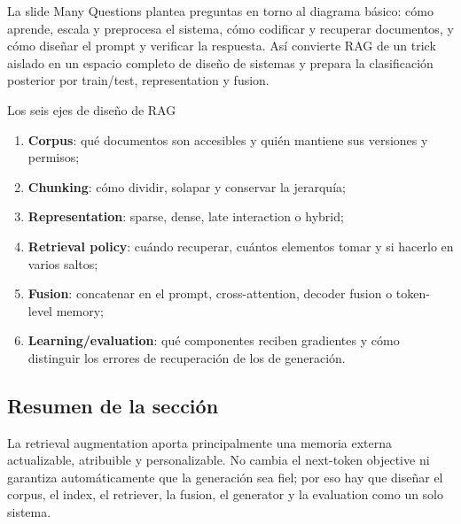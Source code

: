 La slide Many Questions plantea preguntas en torno al diagrama básico: cómo aprende, escala y preprocesa el sistema, cómo codificar y recuperar documentos, y cómo diseñar el prompt y verificar la respuesta. Así convierte RAG de un trick aislado en un espacio completo de diseño de sistemas y prepara la clasificación posterior por train/test, representation y fusion.


\begin{importantbox}{Los seis ejes de diseño de RAG}
\begin{enumerate}
  \item \textbf{Corpus}: qué documentos son accesibles y quién mantiene sus versiones y permisos;
  \item \textbf{Chunking}: cómo dividir, solapar y conservar la jerarquía;
  \item \textbf{Representation}: sparse, dense, late interaction o hybrid;
  \item \textbf{Retrieval policy}: cuándo recuperar, cuántos elementos tomar y si hacerlo en varios saltos;
  \item \textbf{Fusion}: concatenar en el prompt, cross-attention, decoder fusion o token-level memory;
  \item \textbf{Learning/evaluation}: qué componentes reciben gradientes y cómo distinguir los errores de recuperación de los de generación.
\end{enumerate}
\end{importantbox}

\subsection{Resumen de la sección}

La retrieval augmentation aporta principalmente una memoria externa actualizable, atribuible y personalizable. No cambia el next-token objective ni garantiza automáticamente que la generación sea fiel; por eso hay que diseñar el corpus, el index, el retriever, la fusion, el generator y la evaluation como un solo sistema.
